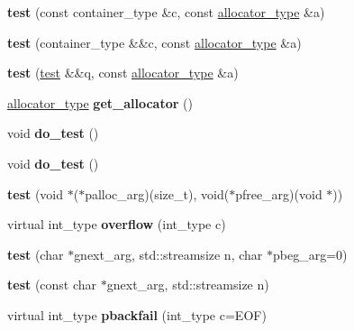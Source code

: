 \begin{DoxyCompactItemize}
{\bfseries test} (const container\+\_\+type \&c, const \mbox{\hyperlink{classtest__allocator}{allocator\+\_\+type}} \&a)
\item 
\mbox{\label{structtest_aef6ed044b832639007cc1d24832f1270}} 
{\bfseries test} (container\+\_\+type \&\&c, const \mbox{\hyperlink{classtest__allocator}{allocator\+\_\+type}} \&a)
\item 
\mbox{\label{structtest_af196249915ea3bdf67539228ebab8fd6}} 
{\bfseries test} (\mbox{\hyperlink{structtest}{test}} \&\&q, const \mbox{\hyperlink{classtest__allocator}{allocator\+\_\+type}} \&a)
\item 
\mbox{\label{structtest_ac118a5169aefd32532363da721910981}} 
\mbox{\hyperlink{classtest__allocator}{allocator\+\_\+type}} {\bfseries get\+\_\+allocator} ()
\item 
\mbox{\label{structtest_a4d498de36d16ae6355266c141632e2e3}} 
void {\bfseries do\+\_\+test} ()
\item 
\mbox{\label{structtest_a4d498de36d16ae6355266c141632e2e3}} 
void {\bfseries do\+\_\+test} ()
\item 
\mbox{\label{structtest_aed88341bf1b03ae7ed06fc789f6e805c}} 
{\bfseries test} (void $\ast$($\ast$palloc\+\_\+arg)(size\+\_\+t), void($\ast$pfree\+\_\+arg)(void $\ast$))
\item 
\mbox{\label{structtest_ac03e0cc28cd3e8b9b22f4cd2d14d67f9}} 
virtual int\+\_\+type {\bfseries overflow} (int\+\_\+type c)
\item 
\mbox{\label{structtest_aa7a3b5d27789289e3e858b0e77ee11d5}} 
{\bfseries test} (char $\ast$gnext\+\_\+arg, std\+::streamsize n, char $\ast$pbeg\+\_\+arg=0)
\item 
\mbox{\label{structtest_abf34ea6c2d85c399e7cbc02a8d5e4473}} 
{\bfseries test} (const char $\ast$gnext\+\_\+arg, std\+::streamsize n)
\item 
\mbox{\label{structtest_aaed37ea6a525fe78a6880b1a656e01dc}} 
virtual int\+\_\+type {\bfseries pbackfail} (int\+\_\+type c=E\+OF)
\item 

\end{DoxyCompactItemize}
